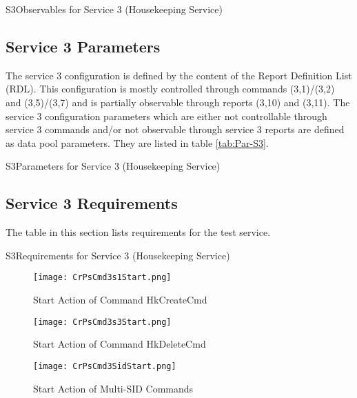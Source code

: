 \documentclass{pnp_article}
\begin{document}
\begin{cr_obs}{S3}{Observables for Service 3 (Housekeeping Service)}
\end{cr_obs}

\newpage
\subsection{Service 3 Parameters}\label{sec:serv3Par}
The service 3 configuration is defined by the content of the Report Definition List (RDL). This configuration is mostly controlled through commands (3,1)/(3,2) and (3,5)/(3,7) and is partially observable through reports (3,10) and (3,11). The service 3 configuration parameters which are either not controllable through service 3 commands and/or not observable through service 3 reports are defined as data pool parameters. They are listed in table \ref{tab:Par-S3}.

\begin{cr_par}{S3}{Parameters for Service 3 (Housekeeping Service)}
\end{cr_par}

\subsection{Service 3 Requirements}
The table in this section lists requirements for the test service.

\begin{cr_req}{S3}{Requirements for Service 3 (Housekeeping Service)}
\end{cr_req}

\begin{figure}[H]
 \centering
 \texttt{[image: CrPsCmd3s1Start.png]}
 \caption{Start Action of Command HkCreateCmd}
 \label{fig:Cmd3s1Start}
\end{figure}

\begin{figure}[H]
 \centering
 \texttt{[image: CrPsCmd3s3Start.png]}
 \caption{Start Action of Command HkDeleteCmd}
 \label{fig:Cmd3s3Start}
\end{figure}

\begin{figure}[H]
 \centering
 \texttt{[image: CrPsCmd3SidStart.png]}
 \caption{Start Action of Multi-SID Commands}
 \label{fig:Cmd3SidStart}
\end{figure}
\end{document}
